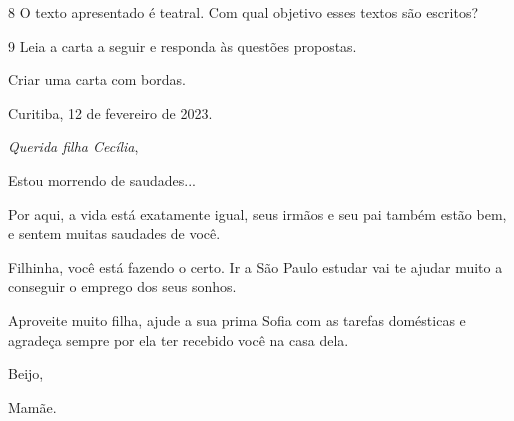 
\num{8} O texto apresentado é teatral. Com qual objetivo esses textos são
escritos?


\num{9} Leia a carta a seguir e responda às questões propostas.

Criar uma carta com bordas.

\begin{mdframed}[linewidth=10pt,linecolor=salmao!20,backgroundcolor=salmao!20,roundcorner=20pt]
Curitiba, 12 de fevereiro de 2023.

\emph{Querida filha Cecília},

Estou morrendo de saudades...

Por aqui, a vida está exatamente igual, seus irmãos e seu pai também
estão bem, e sentem muitas saudades de você.

Filhinha, você está fazendo o certo. Ir a São Paulo estudar vai te
ajudar muito a conseguir o emprego dos seus sonhos.

Aproveite muito filha, ajude a sua prima Sofia com as tarefas domésticas
e agradeça sempre por ela ter recebido você na casa dela.

\begin{flushright}
Beijo,

Mamãe.
\end{flushright}
\end{mdframed}


